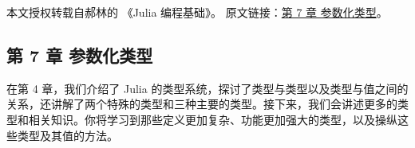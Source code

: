 
本文授权转载自郝林的 《Julia 编程基础》。 原文链接：\href{https://github.com/hyper0x/JuliaBasics/blob/master/book/ch07.md}{第 7 章 参数化类型}。


\subsection{第 7 章 参数化类型}

在第 4 章，我们介绍了 Julia 的类型系统，探讨了类型与类型以及类型与值之间的关系，还讲解了两个特殊的类型和三种主要的类型。接下来，我们会讲述更多的类型和相关知识。你将学习到那些定义更加复杂、功能更加强大的类型，以及操纵这些类型及其值的方法。